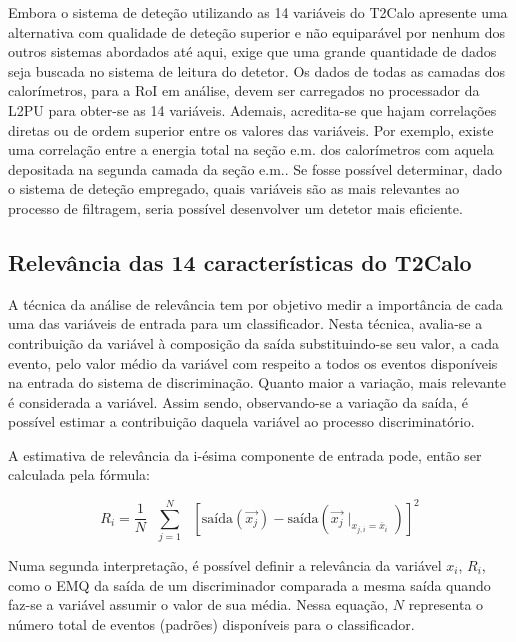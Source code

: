Embora o sistema de deteção utilizando as 14 variáveis do T2Calo apresente uma
alternativa com qualidade de deteção superior e não equiparável por nenhum dos
outros sistemas abordados até aqui, exige que uma grande quantidade de dados
seja buscada no sistema de leitura do detetor. Os dados de todas as camadas
dos calorímetros, para a RoI em análise, devem ser carregados no processador
da L2PU para obter-se as 14 variáveis. Ademais, acredita-se que hajam
correlações diretas ou de ordem superior entre os valores das variáveis. Por
exemplo, existe uma correlação entre a energia total na seção e.m. dos
calorímetros com aquela depositada na segunda camada da seção e.m.. Se fosse
possível determinar, dado o sistema de deteção empregado, quais variáveis são
as mais relevantes ao processo de filtragem, seria possível desenvolver um
detetor mais eficiente.

\subsection{Relevância das 14 características do T2Calo}
\label{sec:t2calo-all-relev}

A técnica da análise de relevância \cite{relevance} tem por objetivo medir a
importância de cada uma das variáveis de entrada para um classificador. Nesta
técnica, avalia-se a contribuição da variável à composição da saída
substituindo-se seu valor, a cada evento, pelo valor médio da variável com
respeito a todos os eventos disponíveis na entrada do sistema de
discriminação. Quanto maior a variação, mais relevante é considerada a
variável. Assim sendo, observando-se a variação da saída, é possível estimar a
contribuição daquela variável ao processo discriminatório.

A estimativa de relevância da i-ésima componente de entrada pode, então ser
calculada pela fórmula:

\begin{equation}
R_i = \frac{1}{N} \text{ } \overset{N}{\underset{j=1}{\sum}} \text{ }
[\text{saída}(\overrightarrow{x_j}) -
\text{saída}(\overrightarrow{x_j}\mid_{x_{j,i} = \overline{x}_i})]^2 
\label{eq:relevance-mse}
\end{equation}

Numa segunda interpretação, é possível definir a relevância da variável $x_i$,
$R_i$, como o EMQ da saída de um discriminador comparada a mesma saída quando
faz-se a variável assumir o valor de sua média. Nessa equação, $N$ representa
o número total de eventos (padrões) disponíveis para o classificador.

